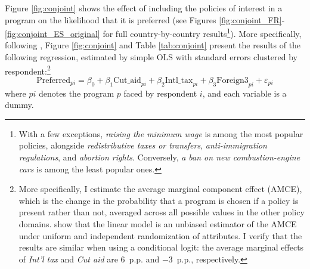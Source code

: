 \documentclass[12pt,english]{article}
\begin{document}
Figure \ref{fig:conjoint} shows the effect of including the policies of interest in a program on the likelihood that it is preferred (see Figures \ref{fig:conjoint_FR}-\ref{fig:conjoint_ES_original} for full country-by-country results\footnote{With a few exceptions, \textit{raising the minimum wage} is among the most popular policies, alongside \textit{redistributive taxes or transfers}, \textit{anti-immigration regulations}, and \textit{abortion rights}. 
Conversely, \textit{a ban on new combustion-engine cars} is among the least popular ones.}). 
More specifically, following \cite{hainmueller_causal_2014}, Figure \ref{fig:conjoint} and Table \ref{tab:conjoint} present the results %
of the following regression, estimated by simple OLS with standard errors clustered by respondent:\footnote{More specifically, I estimate the average marginal component effect (AMCE), which is the change in the probability that a program is chosen if a policy is present rather than not, averaged across all possible values in the other policy domains. \cite{hainmueller_causal_2014} show that the linear model is an unbiased estimator of the AMCE under uniform and independent randomization of attributes. %
I verify that the results are similar when using a conditional logit: the average marginal effects of \textit{Int'l tax} and \textit{Cut aid} are 6~p.p. and $-$3~p.p., respectively.}
\begin{equation}\label{eq:conjoint}
\text{Preferred}_{pi} = \beta_0 + \beta_1 \text{Cut\_aid}_{pi} + \beta_2 \text{Intl\_tax}_{pi} + \beta_3 \text{Foreign3}_{pi} + \varepsilon_{pi}  
\end{equation}
where $pi$ denotes the %
program $p$ faced by respondent $i$, and each variable is a dummy. 
\end{document}
